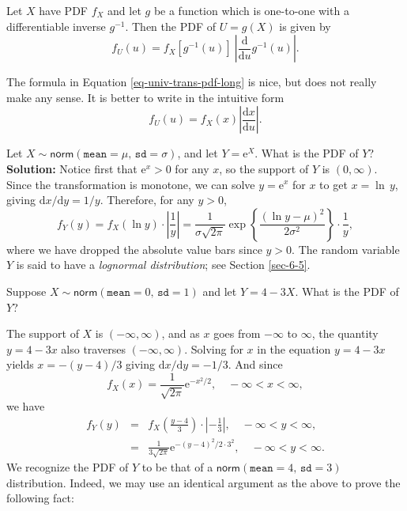\documentclass[captions=tableheading]{scrbook}
\begin{document}
\begin{prop}

Let \(X\) have PDF \(f_{X}\) and let \(g\) be a function which is one-to-one with a differentiable inverse \(g^{-1}\). Then the PDF of \(U=g(X)\) is given by
\begin{equation}
f_{U}(u)=f_{X}\left[g^{-1}(u)\right]\ \left|\frac{\mathrm{d}}{\mathrm{d} u}g^{-1}(u)\right|.\label{eq-univ-trans-pdf-long}
\end{equation}
\end{prop}

\begin{rem}
The formula in Equation \ref{eq-univ-trans-pdf-long} is nice, but does not really make any sense. It is better to write in the intuitive form
\begin{equation}
f_{U}(u)=f_{X}(x)\left|\frac{\mathrm{d} x}{\mathrm{d} u}\right|.\label{eq-univ-trans-pdf-short}
\end{equation}
\end{rem}

\begin{example}
Let \(X\sim\mathsf{norm}(\mathtt{mean}=\mu,\,\mathtt{sd}=\sigma)\), and let \(Y=\mathrm{e}^{X}\). What is the PDF of \(Y\)? 
\textbf{Solution:} Notice first that \(\mathrm{e}^{x}>0\) for any \(x\), so the support of \(Y\) is \((0,\infty)\). Since the transformation is monotone, we can solve \(y=\mathrm{e}^{x}\) for \(x\) to get \(x=\ln\, y\), giving \(\mathrm{d} x/\mathrm{d} y=1/y\). Therefore, for any \(y>0\),
\[
f_{Y}(y)=f_{X}(\ln y)\cdot\left|\frac{1}{y}\right|=\frac{1}{\sigma\sqrt{2\pi}}\exp\left\{ \frac{(\ln y-\mu)^{2}}{2\sigma^{2}}\right\} \cdot\frac{1}{y},
\]
where we have dropped the absolute value bars since \(y>0\). The random variable \(Y\) is said to have a \emph{lognormal distribution}; see Section \ref{sec-6-5}.
\end{example}

\begin{example}
Suppose \(X\sim\mathsf{norm}(\mathtt{mean}=0,\,\mathtt{sd}=1)\) and let \(Y=4-3X\). What is the PDF of \(Y\)?
\end{example}

The support of \(X\) is \((-\infty,\infty)\), and as \(x\) goes from \(-\infty\) to \(\infty\), the quantity \(y=4-3x\) also traverses \((-\infty,\infty)\). Solving for \(x\) in the equation \(y=4-3x\) yields \(x=-(y-4)/3\) giving \(\mathrm{d} x/\mathrm{d} y=-1/3\). And since
\[
f_{X}(x)=\frac{1}{\sqrt{2\pi}}\mathrm{e}^{-x^{2}/2}, \quad -\infty < x < \infty ,
\]
we have
\begin{eqnarray*}
f_{Y}(y) & = & f_{X}\left(\frac{y-4}{3}\right)\cdot\left|-\frac{1}{3}\right|,\quad -\infty < y < \infty,\\
 & = & \frac{1}{3\sqrt{2\pi}}\mathrm{e}^{-(y-4)^{2}/2\cdot3^{2}},\quad -\infty < y < \infty.
\end{eqnarray*}
We recognize the PDF of \(Y\) to be that of a \(\mathsf{norm}(\mathtt{mean}=4,\,\mathtt{sd}=3)\) distribution. Indeed, we may use an identical argument as the above to prove the following fact:
\end{document}

